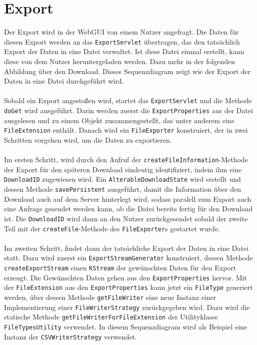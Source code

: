 \section{Export}
Der Export wird in der WebGUI von einem Nutzer angefragt. Die Daten für diesen Export werden an das \texttt{ExportServlet} übertragen, das den tatsächlich Export der Daten in eine Datei verwaltet. Ist diese Datei einmal erstellt, kann diese von dem Nutzer heruntergeladen werden. Dazu mehr in der folgenden Abbildung über den Download. Dieses Sequenzdiagram zeigt wie der Export der Daten in eine Datei durchgeführt wird.\\\\
Sobald ein Export angestoßen wird, startet das \texttt{ExportServlet} und die Methode \texttt{doGet} wird ausgeführt. Darin werden zuerst die \texttt{ExportProperties} aus der Datei ausgelesen und zu einem Objekt zusammengestellt, das unter anderem eine \texttt{FileExtension} enthält. Danach wird ein \texttt{FileExporter} konstruiert, der in zwei Schritten vorgehen wird, um die Daten zu exportieren.\\\\
Im ersten Schritt, wird durch den Aufruf der \texttt{createFileInformation}-Methode der Export für den späteren Download eindeutig identifiziert, indem ihm eine \texttt{DownloadID} zugewiesen wird. Ein \texttt{AlterableDownloadState} wird erstellt und dessen Methode \texttt{savePersistent} ausgeführt, damit die Information über den Download auch auf dem Server hinterlegt wird, sodass paralell zum Export auch eine Anfrage gesendet werden kann, ob die Datei bereits fertig für den Download ist. Die \texttt{DownloadID} wird dann an den Nutzer zurückgesendet sobald der zweite Teil mit der \texttt{createFile}-Methode des \texttt{FileExporter}s gestartet wurde.\\\\
Im zweiten Schritt, findet dann der tatsächliche Export der Daten in eine Datei statt. Dazu wird zuerst ein \texttt{ExportStreamGenerator} konstruiert, dessen Methode \texttt{createExportStream} einen \texttt{KStream} der gewünschten Daten für den Export erzeugt. Die Gewünschten Daten gehen aus den \texttt{ExportProperties} hervor. Mit der \texttt{FileExtension} aus den \texttt{ExportProperties} kann jetzt ein \texttt{FileType} generiert werden, über dessen Methode \texttt{getFileWriter} eine neue Instanz einer Implementierung einer \texttt{FileWriterStrategy} zurückgegeben wird. Dazu wird die statische Methode \texttt{getFileWriterForFileExtension} der Utilityklasse \texttt{FileTypesUtility} verwendet. In diesem Sequenzdiagram wird als Beispiel eine Instanz der \texttt{CSVWriterStrategy} verwendet.\\\\
